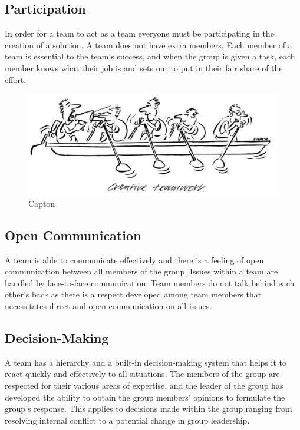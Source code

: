 \documentclass{article}\usepackage[]{graphicx}\usepackage[]{color}
\begin{document}
\subsection{Participation}
In order for a team to act as a team everyone must be participating in the creation of a solution. A team does not have extra members. Each member of a team is essential to the team's success, and when the group is given a task, each member knows what their job is and sets out to put in their fair share of the effort.

\begin{figure}
\includegraphics[width=1.00\textwidth]{../figure/creative_teamwork.jpg}
\caption{Capton}
\end{figure}

\subsection{Open Communication}
A team is able to communicate effectively and there is a feeling of open communication between all members of the group. Issues within a team are handled by face-to-face communication. Team members do not talk behind each other's back as there is a respect developed among team members that necessitates direct and open communication on all issues.

\subsection{Decision-Making}
A team has a hierarchy and a built-in decision-making system that helps it to react quickly and effectively to all situations. The members of the group are respected for their various areas of expertise, and the leader of the group has developed the ability to obtain the group members' opinions to formulate the group's response. This applies to decisions made within the group ranging from resolving internal conflict to a potential change in group leadership.
\end{document}
